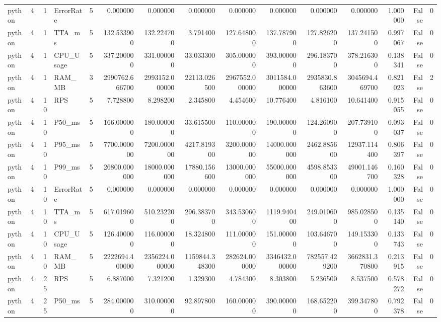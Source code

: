 \begin{tabular}{lrrlrrrrrrrrrrr}
python & 4 & 1 & ErrorRate & 5 & 0.000000 & 0.000000 & 0.000000 & 0.000000 & 0.000000 & 0.000000 & 0.000000 & 1.000000 & False & 0 \\
python & 4 & 1 & TTA_ms & 5 & 132.533900 & 132.224700 & 3.791400 & 127.648000 & 137.787900 & 127.826200 & 137.241500 & 0.997067 & False & 0 \\
python & 4 & 1 & CPU_Usage & 5 & 337.200000 & 331.000000 & 33.033300 & 305.000000 & 393.000000 & 296.183700 & 378.216300 & 0.138341 & False & 0 \\
python & 4 & 1 & RAM_MB & 3 & 2990762.666700 & 2993152.000000 & 22113.026500 & 2967552.000000 & 3011584.000000 & 2935830.863600 & 3045694.469700 & 0.821023 & False & 2 \\
python & 4 & 10 & RPS & 5 & 7.728800 & 8.298200 & 2.345800 & 4.454600 & 10.776400 & 4.816100 & 10.641400 & 0.915055 & False & 0 \\
python & 4 & 10 & P50_ms & 5 & 166.000000 & 180.000000 & 33.615500 & 110.000000 & 190.000000 & 124.260900 & 207.739100 & 0.093037 & False & 0 \\
python & 4 & 10 & P95_ms & 5 & 7700.000000 & 7200.000000 & 4217.819300 & 3200.000000 & 14000.000000 & 2462.885600 & 12937.114400 & 0.806397 & False & 0 \\
python & 4 & 10 & P99_ms & 5 & 26800.000000 & 18000.000000 & 17880.156600 & 13000.000000 & 55000.000000 & 4598.853300 & 49001.146700 & 0.160328 & False & 0 \\
python & 4 & 10 & ErrorRate & 5 & 0.000000 & 0.000000 & 0.000000 & 0.000000 & 0.000000 & 0.000000 & 0.000000 & 1.000000 & False & 0 \\
python & 4 & 10 & TTA_ms & 5 & 617.019600 & 510.232200 & 296.383700 & 343.530600 & 1119.940400 & 249.010600 & 985.028500 & 0.135140 & False & 0 \\
python & 4 & 10 & CPU_Usage & 5 & 126.400000 & 116.000000 & 18.324800 & 111.000000 & 151.000000 & 103.646700 & 149.153300 & 0.133743 & False & 0 \\
python & 4 & 10 & RAM_MB & 5 & 2222694.400000 & 2356224.000000 & 1159844.348300 & 282624.000000 & 3346432.000000 & 782557.429200 & 3662831.370800 & 0.213915 & False & 0 \\
python & 4 & 25 & RPS & 5 & 6.887000 & 7.321200 & 1.329300 & 4.784300 & 8.303800 & 5.236500 & 8.537500 & 0.578272 & False & 0 \\
python & 4 & 25 & P50_ms & 5 & 284.000000 & 310.000000 & 92.897800 & 160.000000 & 390.000000 & 168.652200 & 399.347800 & 0.792378 & False & 0 \\

\end{tabular}
